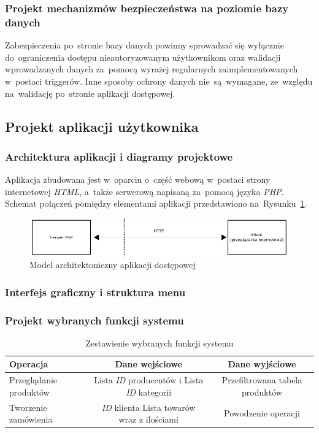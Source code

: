 \documentclass[a4paper, 12pt]{article}
\begin{document}
\subsubsection{Projekt mechanizmów bezpieczeństwa na poziomie bazy danych}
Zabezpieczenia po~stronie bazy danych powinny sprowadzać się wyłącznie do~ograniczenia dostępu nieautoryzowanym użytkownikom oraz walidacji wprowadzanych danych za~pomocą wyrażej regularnych zaimplementowanych w~postaci triggerów. Inne sposoby ochrony danych nie~są~wymagane, ze~względu na~walidację po~stronie aplikacji dostępowej.
\subsection{Projekt aplikacji użytkownika}
\subsubsection{Architektura aplikacji i diagramy projektowe}
Aplikacja zbudowana jest w~oparciu o~część webową w~postaci strony internetowej \textit{HTML}, a~także serwerową napisaną za~pomocą języka \textit{PHP}. Schemat połączeń pomiędzy elementami aplikacji przedstawiono na~Rysunku~\ref{fig:architekturaAplikacji}.

\begin{figure}[H]
	\includegraphics[width=14cm]{modelAplikacji.png}
	\caption[Architektura aplikacji]{Model architektoniczny aplikacji dostępowej}
	\label{fig:architekturaAplikacji}
\end{figure}

\subsubsection{Interfejs graficzny i struktura menu}
\subsubsection{Projekt wybranych funkcji systemu}
\begin{table}[H]
	\caption[Zestawienie wybranych funkcji systemu]{Zestawienie wybranych funkcji systemu}
	\label{tab:wybraneFunkcjeSystemu}
		\hskip-2.5cm\begin{tabular}{ l c c }
			Operacja & Dane wejściowe & Dane wyjściowe \\ \hline
			Przeglądanie produktów & Lista \textit{ID} producentów i Lista \textit{ID} kategorii & Przefiltrowana tabela produktów \\ \hline
		    Tworzenie zamówienia & \textit{ID} klienta Lista towarów wraz z ilościami & Powodzenie operacji \\ \hline
		\end{tabular}
\end{table}
\end{document}
